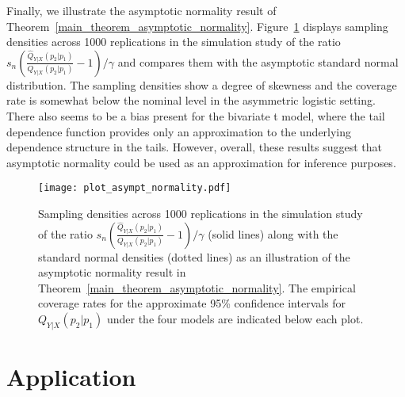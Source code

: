 \documentclass[11pt,letterpaper]{article}
\def\g{\gamma}
\numberwithin{equation}{section}
\begin{document}
Finally, we illustrate the asymptotic normality result of Theorem~\ref{main_theorem_asymptotic_normality}. Figure~\ref{sim:asympt_norm} displays sampling densities across 1000 replications in the simulation study of the ratio $s_n\left(\frac{\widehat{Q}_{Y|X}(p_2|p_1)}{Q_{Y|X}(p_2|p_1)}- 1\right)/\g$ and compares them with the asymptotic standard normal distribution. The sampling densities show a degree of skewness and the coverage rate is somewhat below the nominal level in the asymmetric logistic setting. There also seems to be a bias present for the bivariate t model, where the tail dependence function provides only an approximation to the underlying dependence structure in the tails. However, overall, these results suggest that asymptotic normality could be used as an approximation for inference purposes.


\begin{figure}[H]
  \centering 
    \texttt{[image: plot\_asympt\_normality.pdf]}
    \caption{Sampling densities across 1000 replications in the simulation study of the ratio $s_n\left(\frac{\widehat{Q}_{Y|X}(p_2|p_1)}{Q_{Y|X}(p_2|p_1)}- 1\right)/\g$ (solid lines) along with the standard normal densities (dotted lines) as an illustration of the asymptotic normality result in Theorem~\ref{main_theorem_asymptotic_normality}. The empirical coverage rates for the approximate 95\% confidence intervals for $Q_{Y|X}(p_2|p_1)$ under the four models are indicated below each plot.}
  \label{sim:asympt_norm}
    \end{figure}



\section{Application}\label{sappl}
\end{document}
